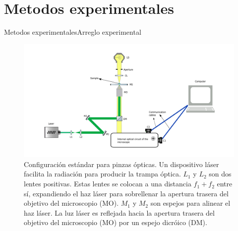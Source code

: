 \documentclass[10pt,aspectratio=1610,compress,dvipsnames]{beamer}
\begin{document}
\section{Metodos experimentales}
\begin{frame}{Metodos experimentales}{Arreglo experimental}

\begin{figure}
    \centering
    \includegraphics[scale=0.27]{Newplots_microfluidics_results/setup3.png}
    \caption{Configuración estándar para pinzas ópticas. Un dispositivo láser facilita la radiación para producir la trampa óptica. $L_1$ y $L_2$ son dos lentes positivas. Estas lentes se colocan a una distancia $f_1 + f_2$ entre sí, expandiendo el haz láser para sobrellenar la apertura trasera del objetivo del microscopio (MO). $M_1$ y $M_2$ son espejos para alinear el haz láser. La luz láser es reflejada hacia la apertura trasera del objetivo del microscopio (MO) por un espejo dicróico (DM).}
    \label{setuptweezers}
\end{figure}

\end{frame}
\end{document}
